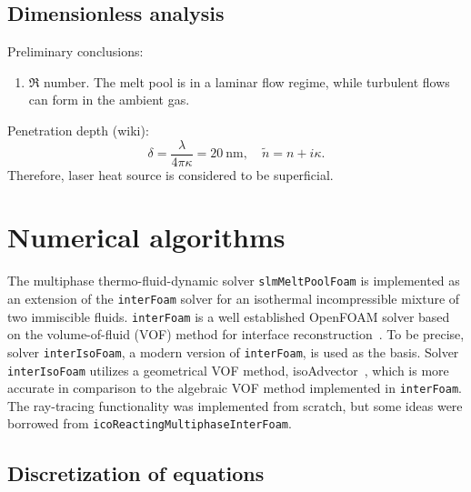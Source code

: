 \documentclass[final]{elsarticle} %
\newcommand{\OpenFOAM}{OpenFOAM\textregistered\xspace}
\begin{document}
\subsection{Dimensionless analysis}

Preliminary conclusions:
\begin{enumerate}
    \item $\Re$ number. The melt pool is in a laminar flow regime, while  turbulent flows can form in the ambient gas.
\end{enumerate}

Penetration depth (wiki):
\begin{equation*}
    \delta = \frac{\lambda}{4\pi\kappa} = \SI{20}{\nm}, \quad
    \tilde{n} = n + i\kappa.
\end{equation*}
Therefore, laser heat source is considered to be superficial.

\section{Numerical algorithms}

The multiphase thermo-fluid-dynamic solver \texttt{slmMeltPoolFoam}
is implemented as an extension of the \texttt{interFoam} solver
for an isothermal incompressible mixture of two immiscible fluids.
\texttt{interFoam} is a well established \OpenFOAM solver
based on the volume-of-fluid (VOF) method for interface reconstruction~\cite{hirt1981volume}.
To be precise, solver \texttt{interIsoFoam}, a modern version of \texttt{interFoam},
is used as the basis.
Solver \texttt{interIsoFoam} utilizes a geometrical VOF method,
isoAdvector~\cite{roenby2016computational}, which is more accurate in comparison to
the algebraic VOF method implemented in \texttt{interFoam}.
The ray-tracing functionality was implemented from scratch, but some ideas were
borrowed from \texttt{icoReactingMultiphaseInterFoam}.

\subsection{Discretization of equations}
\end{document}
